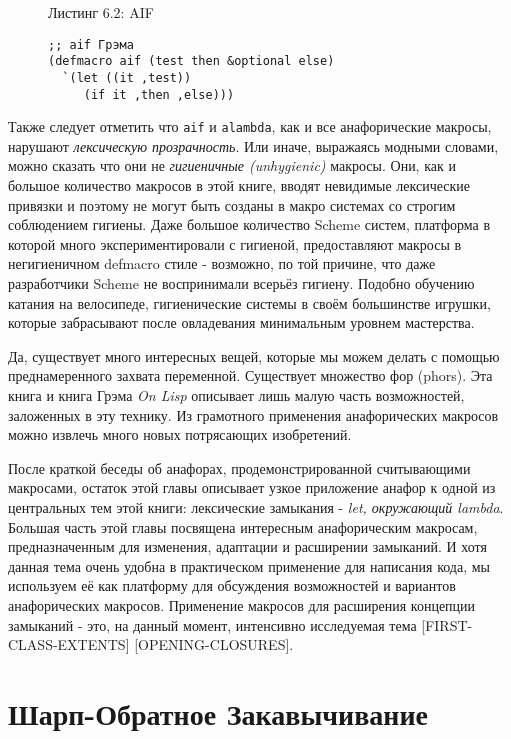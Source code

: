 \begin{figure}Листинг 6.2: AIF\label{listing_6.2}
\listbegin
\begin{verbatim}
;; aif Грэма
(defmacro aif (test then &optional else)
  `(let ((it ,test))
     (if it ,then ,else)))
\end{verbatim}
\listend
\end{figure}

Также следует отметить что \verb"aif" и \verb"alambda", как и все анафорические макросы, нарушают \emph{лексическую прозрачность}. Или иначе, выражаясь модными словами, можно сказать что они не \emph{гигиеничные (unhygienic)} макросы. Они, как и большое количество макросов в этой книге, вводят невидимые лексические привязки и поэтому не могут быть созданы в макро системах со строгим соблюдением гигиены. Даже большое количество Scheme систем, платформа в которой много экспериментировали с гигиеной, предоставляют макросы в негигиеничном defmacro стиле - возможно, по той причине, что даже разработчики Scheme не воспринимали всерьёз гигиену. Подобно обучению катания на велосипеде, гигиенические системы в своём большинстве игрушки, которые забрасывают после овладевания минимальным уровнем мастерства.

Да, существует много интересных вещей, которые мы можем делать с помощью преднамеренного захвата переменной. Существует множество фор (phors). Эта книга и книга Грэма \emph{On Lisp} описывает лишь малую часть возможностей, заложенных в эту технику. Из грамотного применения анафорических макросов можно извлечь много новых потрясающих изобретений.

После краткой беседы об анафорах, продемонстрированной считывающими макросами, остаток этой главы описывает узкое приложение анафор к одной из центральных тем этой книги: лексические замыкания - \emph{let, окружающий lambda}. Большая часть этой главы посвящена интересным анафорическим макросам, предназначенным для изменения, адаптации и расширении замыканий. И хотя данная тема очень удобна в практическом применение для написания кода, мы используем её как платформу для обсуждения возможностей и вариантов анафорических макросов. Применение макросов для расширения концепции замыканий - это, на данный момент, интенсивно исследуемая тема [FIRST-CLASS-EXTENTS] [OPENING-CLOSURES].

\section{Шарп-Обратное Закавычивание}\label{section_sharp-backquote} 

